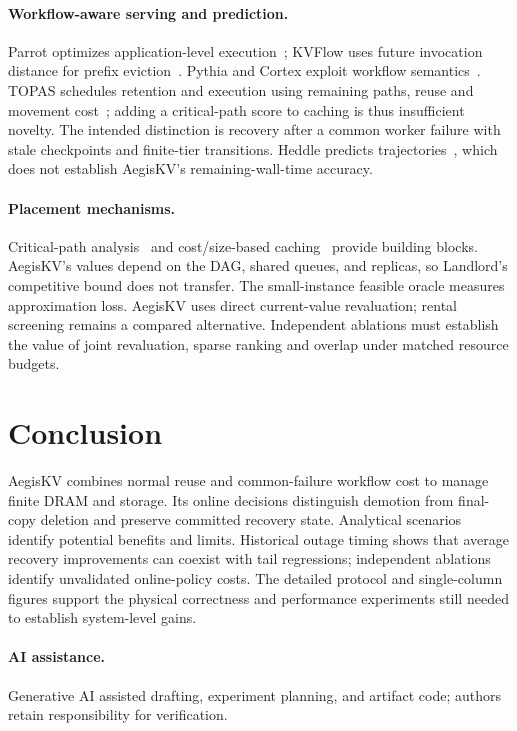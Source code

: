 \documentclass[sigplan,10pt,anonymous,nonacm]{acmart}
\begin{document}
\paragraph{Workflow-aware serving and prediction.}
Parrot optimizes application-level execution~\cite{lin2024parrot}; KVFlow
uses future invocation distance for prefix eviction~\cite{pan2025kvflow}.
Pythia and Cortex exploit workflow semantics~\cite{yu2026pythia,pagonas2025cortex}.
TOPAS schedules retention and execution using remaining paths, reuse and
movement cost~\cite{ni2026topas}; adding a critical-path score to caching
is thus insufficient novelty. The intended distinction is recovery after
a common worker failure with stale checkpoints and finite-tier transitions.
Heddle predicts trajectories~\cite{zhang2026heddle}, which does not establish
AegisKV's remaining-wall-time accuracy.

\paragraph{Placement mechanisms.}
Critical-path analysis~\cite{kelley1959cpm} and cost/size-based caching~\cite{young2002landlord}
provide building blocks. AegisKV's values depend on the DAG, shared queues,
and replicas, so Landlord's competitive bound does not transfer. The
small-instance feasible oracle measures approximation loss. AegisKV uses
direct current-value revaluation; rental screening remains a compared
alternative. Independent ablations must establish the value of joint
revaluation, sparse ranking and overlap under matched resource budgets.

\section{Conclusion}
\label{sec:conclusion}

AegisKV combines normal reuse and common-failure workflow cost to manage
finite DRAM and storage. Its online decisions distinguish demotion from
final-copy deletion and preserve committed recovery state. Analytical
scenarios identify potential benefits and limits. Historical outage timing
shows that average recovery improvements can coexist with tail regressions;
independent ablations identify unvalidated online-policy costs. The detailed
protocol and single-column figures support the physical correctness and performance
experiments still needed to establish system-level gains.

\paragraph{AI assistance.}
Generative AI assisted drafting, experiment planning, and artifact code;
authors retain responsibility for verification.



\end{document}
